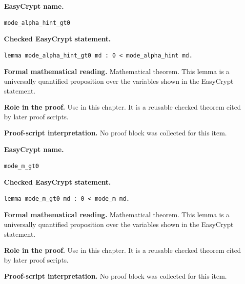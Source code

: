 \begin{formaltheorem}
\noindent\textbf{EasyCrypt name.}
\begin{lstlisting}[language=EasyCrypt,basicstyle=\ttfamily\scriptsize]
mode_alpha_hint_gt0
\end{lstlisting}
\noindent\textbf{Checked EasyCrypt statement.}
\begin{lstlisting}[language=EasyCrypt,basicstyle=\ttfamily\scriptsize]
lemma mode_alpha_hint_gt0 md : 0 < mode_alpha_hint md.
\end{lstlisting}
\noindent\textbf{Formal mathematical reading.}
Mathematical theorem. This lemma is a universally quantified proposition over the variables shown in the EasyCrypt statement.

\noindent\textbf{Role in the proof.}
Use in this chapter. It is a reusable checked theorem cited by later proof scripts.

\noindent\textbf{Proof-script interpretation.}
No proof block was collected for this item.

\end{formaltheorem}

\begin{formaltheorem}
\noindent\textbf{EasyCrypt name.}
\begin{lstlisting}[language=EasyCrypt,basicstyle=\ttfamily\scriptsize]
mode_m_gt0
\end{lstlisting}
\noindent\textbf{Checked EasyCrypt statement.}
\begin{lstlisting}[language=EasyCrypt,basicstyle=\ttfamily\scriptsize]
lemma mode_m_gt0 md : 0 < mode_m md.
\end{lstlisting}
\noindent\textbf{Formal mathematical reading.}
Mathematical theorem. This lemma is a universally quantified proposition over the variables shown in the EasyCrypt statement.

\noindent\textbf{Role in the proof.}
Use in this chapter. It is a reusable checked theorem cited by later proof scripts.

\noindent\textbf{Proof-script interpretation.}
No proof block was collected for this item.

\end{formaltheorem}

